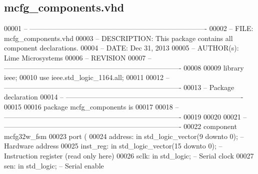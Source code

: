 \subsection{mcfg\+\_\+components.\+vhd}
\label{mcfg__components_8vhd_source}

\begin{DoxyCode}
00001 \textcolor{keyword}{-- ---------------------------------------------------------------------------- }
00002 \textcolor{keyword}{-- FILE:    mcfg\_components.vhd}
00003 \textcolor{keyword}{-- DESCRIPTION: This package contains all component declarations.}
00004 \textcolor{keyword}{-- DATE:    Dec 31, 2013}
00005 \textcolor{keyword}{-- AUTHOR(s):   Lime Microsystems}
00006 \textcolor{keyword}{-- REVISION}
00007 \textcolor{keyword}{-- ---------------------------------------------------------------------------- }
00008 
00009 \textcolor{vhdlkeyword}{library }\textcolor{keywordflow}{ieee};
00010 \textcolor{vhdlkeyword}{use }ieee.std\_logic\_1164.\textcolor{keywordflow}{all};
00011 
00012 \textcolor{keyword}{-- ----------------------------------------------------------------------------}
00013 \textcolor{keyword}{-- Package declaration}
00014 \textcolor{keyword}{-- ----------------------------------------------------------------------------}
00015 
00016 \textcolor{keywordflow}{package }mcfg_components \textcolor{keywordflow}{is}
00017 
00018 \textcolor{keyword}{-- ----------------------------------------------------------------------------}
00019 
00020 
00021 \textcolor{keyword}{-- ----------------------------------------------------------------------------}
00022 \textcolor{keywordflow}{component} mcfg32w\_fsm
00023     \textcolor{keywordflow}{port} (        
00024         address: \textcolor{keywordflow}{in} \textcolor{comment}{std\_logic\_vector}(\textcolor{vhdllogic}{}\textcolor{vhdllogic}{9} \textcolor{keywordflow}{downto} \textcolor{vhdllogic}{}\textcolor{vhdllogic}{0});   \textcolor{keyword}{-- Hardware address}
00025         inst\_reg: \textcolor{keywordflow}{in} \textcolor{comment}{std\_logic\_vector}(\textcolor{vhdllogic}{}\textcolor{vhdllogic}{15} \textcolor{keywordflow}{downto} \textcolor{vhdllogic}{}\textcolor{vhdllogic}{0}); \textcolor{keyword}{-- Instruction register (read only here)}
00026         sclk: \textcolor{keywordflow}{in} \textcolor{comment}{std\_logic};             \textcolor{keyword}{-- Serial clock}
00027         sen: \textcolor{keywordflow}{in} \textcolor{comment}{std\_logic};              \textcolor{keyword}{-- Serial enable}

\end{DoxyCode}
